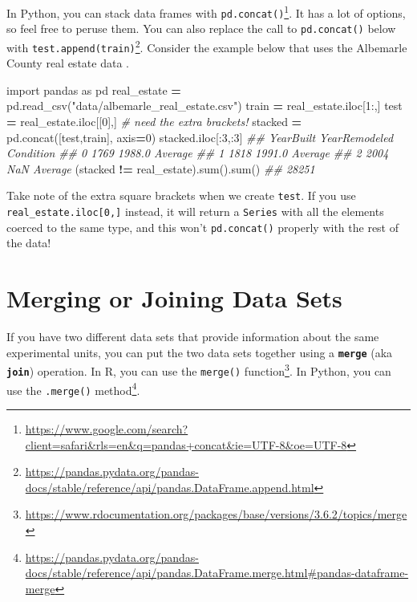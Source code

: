 \documentclass[
  12pt,
  krantz2]{krantz}
\makeatletter
\newenvironment{Shaded}{\begin{snugshade}}{\end{snugshade}}
\newcommand{\BuiltInTok}[1]{#1}
\newcommand{\CommentTok}[1]{\textcolor[rgb]{0.37,0.37,0.37}{\textit{#1}}}
\newcommand{\DecValTok}[1]{\textcolor[rgb]{0.06,0.06,0.06}{#1}}
\newcommand{\ImportTok}[1]{#1}
\newcommand{\NormalTok}[1]{#1}
\newcommand{\OperatorTok}[1]{\textcolor[rgb]{0.43,0.43,0.43}{\textbf{#1}}}
\newcommand{\StringTok}[1]{\textcolor[rgb]{0.5,0.5,0.5}{#1}}
\renewcommand{\href}[2]{#2\footnote{\url{#1}}}
\newenvironment{kframe}{%
\medskip{}
\setlength{\fboxsep}{.8em}
 \def\at@end@of@kframe{}%
 \ifinner\ifhmode%
  \def\at@end@of@kframe{\end{minipage}}%
  \begin{minipage}{\columnwidth}%
 \fi\fi%
 \def\FrameCommand##1{\hskip\@totalleftmargin \hskip-\fboxsep
 \colorbox{shadecolor}{##1}\hskip-\fboxsep
     \hskip-\linewidth \hskip-\@totalleftmargin \hskip\columnwidth}%
 \MakeFramed {\advance\hsize-\width
   \@totalleftmargin\z@ \linewidth\hsize
   \@setminipage}}%
 {\par\unskip\endMakeFramed%
 \at@end@of@kframe}
\renewenvironment{Shaded}{\begin{kframe}}{\end{kframe}}
\makeatother
\begin{document}
In Python, you can stack data frames with \href{https://www.google.com/search?client=safari\&rls=en\&q=pandas+concat\&ie=UTF-8\&oe=UTF-8}{\texttt{pd.concat()}}. It has a lot of options, so feel free to peruse them. You can also replace the call to \texttt{pd.concat()} below with \href{https://pandas.pydata.org/pandas-docs/stable/reference/api/pandas.DataFrame.append.html}{\texttt{test.append(train)}}. Consider the example below that uses the Albemarle County real estate data \citep{albemarle_county_gis_web} \citep{clay_ford}.

\begin{Shaded}
\begin{Highlighting}[]
\ImportTok{import}\NormalTok{ pandas }\ImportTok{as}\NormalTok{ pd}
\NormalTok{real\_estate }\OperatorTok{=}\NormalTok{ pd.read\_csv(}\StringTok{"data/albemarle\_real\_estate.csv"}\NormalTok{)}
\NormalTok{train }\OperatorTok{=}\NormalTok{ real\_estate.iloc[}\DecValTok{1}\NormalTok{:,]}
\NormalTok{test }\OperatorTok{=}\NormalTok{ real\_estate.iloc[[}\DecValTok{0}\NormalTok{],] }\CommentTok{\# need the extra brackets!}
\NormalTok{stacked }\OperatorTok{=}\NormalTok{ pd.concat([test,train], axis}\OperatorTok{=}\DecValTok{0}\NormalTok{)}
\NormalTok{stacked.iloc[:}\DecValTok{3}\NormalTok{,:}\DecValTok{3}\NormalTok{]}
\CommentTok{\#\#    YearBuilt  YearRemodeled Condition}
\CommentTok{\#\# 0       1769         1988.0   Average}
\CommentTok{\#\# 1       1818         1991.0   Average}
\CommentTok{\#\# 2       2004            NaN   Average}
\NormalTok{(stacked }\OperatorTok{!=}\NormalTok{ real\_estate).}\BuiltInTok{sum}\NormalTok{().}\BuiltInTok{sum}\NormalTok{()}
\CommentTok{\#\# 28251}
\end{Highlighting}
\end{Shaded}

Take note of the extra square brackets when we create \texttt{test}. If you use \texttt{real\_estate.iloc{[}0,{]}} instead, it will return a \texttt{Series} with all the elements coerced to the same type, and this won't \texttt{pd.concat()} properly with the rest of the data!

\hypertarget{merging-or-joining-data-sets}{%
\section{Merging or Joining Data Sets}\label{merging-or-joining-data-sets}}

If you have two different data sets that provide information about the same experimental units, you can put the two data sets together using a \textbf{\texttt{merge}} (aka \textbf{\texttt{join}}) operation. In R, you can use the \href{https://www.rdocumentation.org/packages/base/versions/3.6.2/topics/merge}{\texttt{merge()} function}. In Python, you can use the \href{https://pandas.pydata.org/pandas-docs/stable/reference/api/pandas.DataFrame.merge.html\#pandas-dataframe-merge}{\texttt{.merge()} method}.
\end{document}
